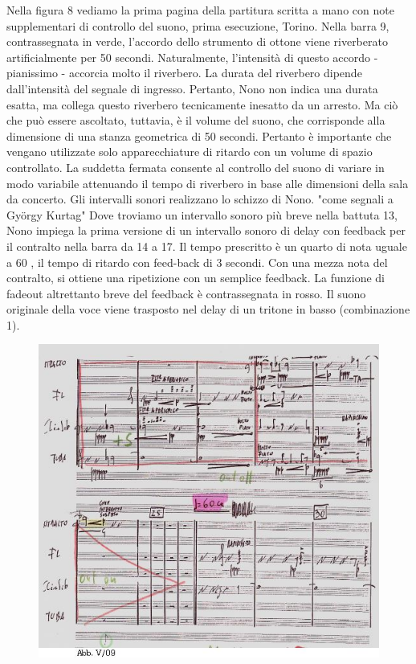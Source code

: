 Nella figura 8 vediamo la prima pagina della partitura scritta a mano con note supplementari di controllo del suono, prima esecuzione, Torino. Nella barra 9, contrassegnata in verde, l'accordo dello strumento di ottone viene riverberato artificialmente per 50 secondi. Naturalmente, l'intensità di questo accordo - pianissimo - accorcia molto il riverbero. La durata del riverbero dipende dall'intensità del segnale di ingresso. Pertanto, Nono non indica una durata esatta, ma collega questo riverbero tecnicamente inesatto da un arresto. Ma ciò che può essere ascoltato, tuttavia, è il volume del suono, che corrisponde alla dimensione di una stanza geometrica di 50 secondi. Pertanto è importante che vengano utilizzate solo apparecchiature di ritardo con un volume di spazio controllato. La suddetta fermata consente al controllo del suono di variare in modo variabile attenuando il tempo di riverbero in base alle dimensioni della sala da concerto. Gli intervalli sonori realizzano lo schizzo di Nono. "come segnali a György Kurtag" Dove troviamo un intervallo sonoro più breve nella battuta 13, Nono impiega la prima versione di un intervallo sonoro di delay con feedback per il contralto nella barra da 14 a 17. Il tempo prescritto è un quarto di nota uguale a 60 , il tempo di ritardo con feed-back di 3 secondi. Con una mezza nota del contralto, si ottiene una ripetizione con un semplice feedback. La funzione di fadeout altrettanto breve del feedback è contrassegnata in rosso. Il suono originale della voce viene trasposto nel delay di un tritone in basso (combinazione 1). 

\begin{figure}[htbp]
\begin{center}
\includegraphics[width=1\textwidth]{images/nono/hph/ab_v_09.jpg}
\caption{}
\label{hph-img9}
\end{center}
\end{figure}

